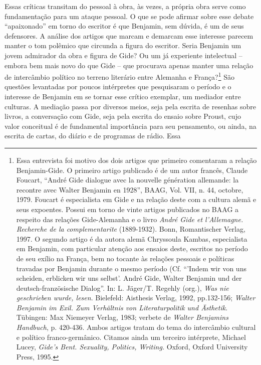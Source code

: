 Essas críticas transitam do pessoal à obra, às vezes, a própria obra
serve como fundamentação para um ataque pessoal. O que se pode afirmar
sobre esse debate ``apaixonado'' em torno do escritor é que Benjamin,
sem dúvida, é um de seus defensores. A análise dos artigos que marcam e
demarcam esse interesse parecem manter o tom polêmico que circunda a
figura do escritor. Seria Benjamin um jovem admirador da obra e figura
de Gide? Ou um já experiente intelectual -- embora bem mais novo do que
Gide -- que procurava apenas manter uma relação de intercâmbio político
no terreno literário entre Alemanha e França?\footnote{Essa entrevista
  foi motivo dos dois artigos que primeiro comentaram a relação
  Benjamin-Gide. O primeiro artigo publicado é de um autor francês,
  Claude Foucart, ``André Gide dialogue avec la nouvelle génération
  allemande: la recontre avec Walter Benjamin en 1928'', BAAG, Vol. VII,
  n. 44, octobre, 1979. Foucart é especialista em Gide e na relação
  deste com a cultura alemã e seus expoentes. Possui em torno de vinte
  artigos publicados no BAAG a respeito das relações Gide-Alemanha e o
  livro \emph{André Gide et l'Allemagne. Recherche de la
  complementarite} (1889-1932). Bonn, Romantischer Verlag, 1997. O
  segundo artigo é da autora alemã Chryssoula Kambas, especialista em
  Benjamin, com particular atenção aos ensaios deste, escritos no
  período de seu exílio na França, bem no tocante às relações pessoais e
  políticas travadas por Benjamin durante o mesmo período (Cf. ``'Indem
  wir von uns scheiden, erblicken wir uns selbst'. André Gide, Walter
  Benjamin und der deutsch-französische Dialog''. In: L. Jäger/T.
  Regehly (org.), \emph{Was nie geschrieben wurde, lesen}. Bielefeld:
  Aisthesis Verlag, 1992, pp.132-156; \emph{Walter Benjamin im Exil. Zum
  Verhältnis von Literaturpolitik und Ästhetik}. Tübingen: Max Niemeyer
  Verlag, 1983; verbete de \emph{Walter Benjamins Handbuch}, p. 420-436.
  Ambos artigos tratam do tema do intercâmbio cultural e político
  franco-germânico. Citamos ainda um terceiro intérprete, Michael Lucey,
  \emph{Gide's Bent. Sexuality, Politics, Writing.} Oxford, Oxford
  University Press, 1995.} São questões levantadas por poucos
intérpretes que pesquisaram o período e o interesse de Benjamin em se
tornar esse crítico exemplar, um mediador entre culturas. A mediação
passa por diversos meios, seja pela escrita de resenhas sobre livros, a
conversação com Gide, seja pela escrita do ensaio sobre Proust, cujo
valor conceitual é de fundamental importância para seu pensamento, ou
ainda, na escrita de cartas, do diário e de programas de rádio. Essa
